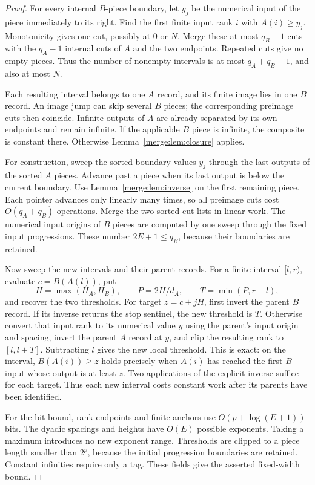 \begin{proof}
For every internal $B$-piece boundary, let $y_j$ be the numerical input
of the piece immediately to its right. Find the first finite input rank
$i$ with $A(i)\geq y_j$. Monotonicity gives one cut, possibly at $0$ or
$N$. Merge these at most $q_B-1$ cuts with the $q_A-1$ internal cuts
of $A$ and the two endpoints. Repeated cuts give no empty pieces. Thus
the number of nonempty intervals is at most $q_A+q_B-1$, and also
at most $N$.

Each resulting interval belongs to one $A$ record, and its finite image
lies in one $B$ record. An image jump can skip several $B$ pieces; the
corresponding preimage cuts then coincide. Infinite outputs of $A$ are
already separated by its own endpoints and remain infinite. If the
applicable $B$ piece is infinite, the composite is constant there.
Otherwise Lemma~\ref{merge:lem:closure} applies.

For construction, sweep the sorted boundary values $y_j$ through the
last outputs of the sorted $A$ pieces. Advance past a piece when its
last output is below the current boundary. Use Lemma~\ref{merge:lem:inverse}
on the first remaining piece. Each pointer advances only linearly many
times, so all preimage cuts cost $O(q_A+q_B)$ operations. Merge the
two sorted cut lists in linear work. The numerical input origins of
$B$ pieces are computed by one sweep through the fixed input
progressions. These number $2E+1\leq q_B$, because their boundaries
are retained.

Now sweep the new intervals and their parent records. For a finite
interval $[l,r)$, evaluate $c=B(A(l))$, put
\[
 H=\max(H_A,H_B),\qquad P=2H/d_A,\qquad T=\min(P,r-l),
\]
and recover the two thresholds. For target $z=c+jH$, first invert the
parent $B$ record. If its inverse returns the stop sentinel, the new
threshold is $T$. Otherwise convert that input rank to its numerical
value $y$ using the parent's input origin and spacing, invert the
parent $A$ record at $y$, and clip the resulting rank to $[l,l+T]$.
Subtracting $l$ gives the new local threshold. This is exact: on the
interval, $B(A(i))\geq z$ holds precisely when $A(i)$ has reached the
first $B$ input whose output is at least $z$. Two applications of the
explicit inverse suffice for each target. Thus each new interval costs
constant work after its parents have been identified.

For the bit bound, rank endpoints and finite anchors use
$O(p+\log(E+1))$ bits. The dyadic spacings and heights have $O(E)$
possible exponents. Taking a maximum introduces no new exponent range.
Thresholds are clipped to a piece length smaller than $2^p$, because
the initial progression boundaries are retained. Constant infinities
require only a tag. These fields give the asserted fixed-width bound.
\end{proof}

